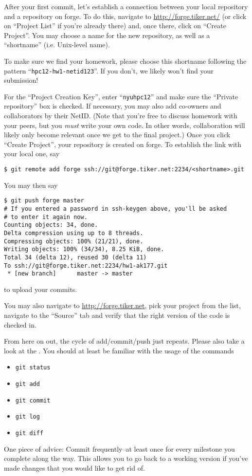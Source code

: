 \documentclass[11pt]{article}
\begin{document}
After your first commit, let's establish a connection between your
local repository and a repository on forge.  To do this, navigate to
\url{http://forge.tiker.net/} (or click on ``Project List'' if you're
already there) and, once there, click on ``Create Project''. You may
choose a name for the new repository, as well as a ``shortname'' (i.e.
Unix-level name).

\begin{note}
To make sure we find your homework, please choose
this shortname following the pattern ``\texttt{hpc12-hw1-netid123}''.
If you don't, we likely won't find your submission!
\end{note}

For the ``Project Creation Key'', enter ``\texttt{nyuhpc12}'' and make
sure the ``Private repository'' box is checked. If necessary, you may
also add co-owners and collaborators by their NetID. (Note that you're
free to discuss homework with your peers, but you \emph{must} write
your own code. In other words, collaboration will likely only become
relevant once we get to the final project.)
Once you click ``Create Project'', your repository is created on
forge.  To establish the link with your local one, say
\begin{lstlisting}
$ git remote add forge ssh://git@forge.tiker.net:2234/<shortname>.git
\end{lstlisting}

You may then say
\begin{lstlisting}
$ git push forge master
# If you entered a password in ssh-keygen above, you'll be asked
# to enter it again now.
Counting objects: 34, done.
Delta compression using up to 8 threads.
Compressing objects: 100% (21/21), done.
Writing objects: 100% (34/34), 8.25 KiB, done.
Total 34 (delta 12), reused 30 (delta 11)
To ssh://git@forge.tiker.net:2234/hw1-ak177.git
 * [new branch]      master -> master
\end{lstlisting}
to upload your commits.

You may also navigate to \url{http://forge.tiker.net}, pick your
project from the list, navigate to the ``Source'' tab and verify that
the right version of the code is checked in.

From here on out, the cycle of add/commit/push just repeats.  Please
also take a look at the
. You should at least be familiar with the usage of the
commands
\begin{itemize}
  \item \texttt{git status}
  \item \texttt{git add}
  \item \texttt{git commit}
  \item \texttt{git log}
  \item \texttt{git diff}
\end{itemize}
One piece of advice: Commit frequently--at least once
for every milestone you complete along the way. This allows you
to go back to a working version if you've made changes that you would
like to get rid of.
\end{document}
